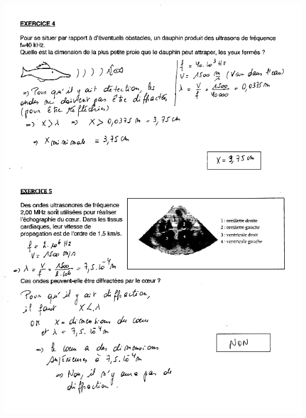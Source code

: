 {\includegraphics[width=18.503cm,height=25.476cm]{Pictures/10000001000002710000035C11CB153182C339CB.png}

}
